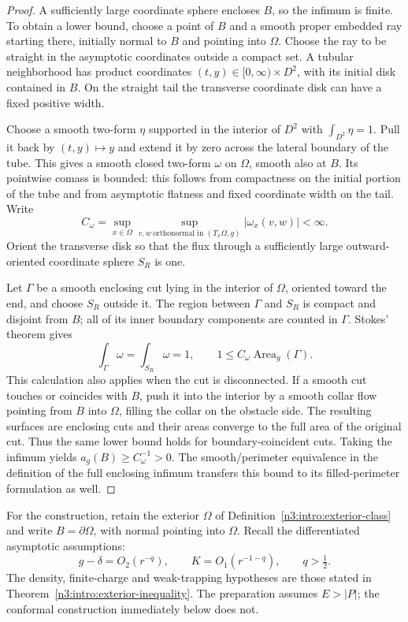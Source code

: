 \begin{proof}
A sufficiently large coordinate sphere encloses $B$, so the infimum
is finite. To obtain a lower bound, choose a point of $B$ and a smooth
proper embedded ray starting there, initially normal to $B$ and pointing
into $\Omega$. Choose the ray to be straight in the asymptotic coordinates
outside a compact set. A tubular neighborhood has product coordinates
$(t,y)\in[0,\infty)\times D^2$, with its initial disk contained in $B$.
On the straight tail the transverse coordinate disk can have a fixed
positive width.

Choose a smooth two-form $\eta$ supported in the interior of $D^2$ with
$\int_{D^2}\eta=1$. Pull it back by $(t,y)\mapsto y$ and extend it by
zero across the lateral boundary of the tube. This gives a smooth
closed two-form $\omega$ on $\Omega$, smooth also at $B$. Its pointwise
comass is bounded: this follows from compactness on the initial portion
of the tube and from asymptotic flatness and fixed coordinate width on
the tail. Write
\[
 C_\omega=\sup_{x\in \Omega}\sup_{
       v,w\ \text{orthonormal in }(T_x\Omega,g)}|\omega_x(v,w)|<\infty.
\]
Orient the transverse disk so that the flux through a sufficiently
large outward-oriented coordinate sphere $S_R$ is one.

Let $\Gamma$ be a smooth enclosing cut lying in the interior of $\Omega$,
oriented toward the end, and choose $S_R$ outside it. The region between
$\Gamma$ and $S_R$ is compact and disjoint from $B$; all of its inner
boundary components are counted in $\Gamma$. Stokes' theorem gives
\[
       \int_\Gamma\omega=\int_{S_R}\omega=1,
       \qquad 1\le C_\omega\operatorname{Area}_g(\Gamma).
\]
This calculation also applies when the cut is disconnected. If a
smooth cut touches or coincides with $B$, push it into the interior
by a smooth collar flow pointing from $B$ into $\Omega$, filling the collar on the obstacle
side. The resulting surfaces are enclosing cuts and their areas
converge to the full area of the original cut. Thus the same lower
bound holds for boundary-coincident cuts. Taking the infimum yields
$a_g(B)\ge C_\omega^{-1}>0$. The smooth/perimeter equivalence in the
definition of the full enclosing infimum transfers this bound to its
filled-perimeter formulation as well.
\end{proof}

For the construction, retain the exterior $\Omega$ of
Definition~\ref{n3:intro:exterior-class} and write $B=\partial\Omega$,
with normal pointing into $\Omega$. Recall the differentiated asymptotic
assumptions:
\begin{equation}\label{n3:reduction:original-decay}
 g-\delta=O_2(r^{-q}),\qquad K=O_1(r^{-1-q}),\qquad q>\tfrac12.
\end{equation}
The density, finite-charge and weak-trapping hypotheses are those stated
in Theorem~\ref{n3:intro:exterior-inequality}. The preparation assumes
$E>|P|$; the conformal construction immediately below does not.

